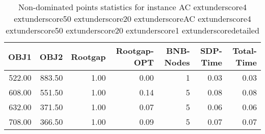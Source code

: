 \begin{table}
\caption{Non-dominated points statistics for instance AC	extunderscore4	extunderscore50	extunderscore20	extunderscoreAC	extunderscore4	extunderscore50	extunderscore20	extunderscore1	extunderscoredetailed}
\label{tab:stats/AC_4_50_20_AC_4_50_20_1_detailed}
\begin{tabular}{rrrrrrr}
\toprule
OBJ1 & OBJ2 & Rootgap & Rootgap-OPT & BNB-Nodes & SDP-Time & Total-Time \\
\midrule
522.00 & 883.50 & 1.00 & 0.00 & 1 & 0.03 & 0.03 \\
608.00 & 551.50 & 1.00 & 0.14 & 5 & 0.08 & 0.08 \\
632.00 & 371.50 & 1.00 & 0.07 & 5 & 0.06 & 0.06 \\
708.00 & 366.50 & 1.00 & 0.09 & 5 & 0.07 & 0.07 \\
\bottomrule
\end{tabular}
\end{table}
